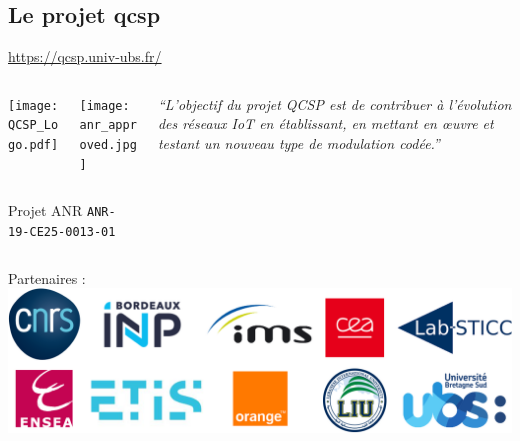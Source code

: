 \documentclass[../main.tex]{subfiles}
\begin{document}
\subsection[Le projet \acrshort{qcsp}]{Le projet \acrfull{qcsp}}

\begin{frame}{\subsecname}{\href{https://qcsp.univ-ubs.fr/}{https://qcsp.univ-ubs.fr/}}

  \begin{columns}
    \begin{column}{.4\linewidth} \centering
      \begin{columns}
        \begin{column}{.4\linewidth}
          \texttt{[image: QCSP\_Logo.pdf]}
        \end{column}
        \begin{column}{.2\linewidth}
          \texttt{[image: anr\_approved.jpg]}
        \end{column}
      \end{columns}
      \small \vspace{5pt} Projet ANR \texttt{ANR-19-CE25-0013-01}
    \end{column}
    \begin{column}{.5\linewidth}
      \emph{``L'objectif du projet QCSP est de contribuer à l'évolution des réseaux IoT en établissant,
        en mettant en œuvre et testant un nouveau type de modulation codée.''}
    \end{column}
  \end{columns}

  \vspace{2 em}

  \begin{center}
    Partenaires :\\
    \includegraphics[width=0.6\linewidth]{figures/logos-thesis/partners-logos.png}
  \end{center}
\end{frame}
\end{document}
